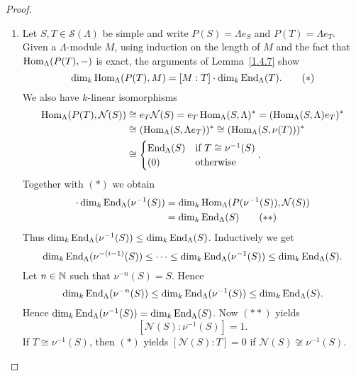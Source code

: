 \begin{proof}
\begin{enumerate}
\item Let $S,T\in\mathcal S(\Lambda)$ be simple and write $P(S)=\Lambda e_S$ and $P(T)=\Lambda e_T$. Given a $\Lambda$-module $M$, using induction on the length of $M$ and the fact that $\operatorname{Hom}_\Lambda(P(T),-)$ is exact, the arguments of Lemma~\ref{1.4.7} show
\[
\dim_k \operatorname{Hom}_\Lambda(P(T),M) = [M:T] \cdot \dim_k\operatorname{End}_\Lambda(T).\tag{$*$}
\]
We also have $k$-linear isomorphisms
\begin{align*}
\operatorname{Hom}_\Lambda(P(T),\mathcal N(S))
& \cong e_T \mathcal N(S)
  = e_T \operatorname{Hom}_\Lambda(S,\Lambda)^*
  = (\operatorname{Hom}_\Lambda(S,\Lambda)e_T)^* \\
& \cong (\operatorname{Hom}_\Lambda(S,\Lambda e_T))^*
  \cong (\operatorname{Hom}_\Lambda(S,\nu(T)))^* \\
& \cong
\begin{cases}
\operatorname{End}_\Lambda(S) & \text{if } T\cong \nu^{-1}(S)\\
(0) & \text{otherwise}
\end{cases}.
\end{align*}
Together with $(*)$ we obtain
\begin{align*}
[\mathcal N(S) : \nu^{-1}(S)] \cdot \dim_k\End_\Lambda(\nu^{-1}(S))
& = \dim_k \Hom_\Lambda(P(\nu^{-1}(S)),\mathcal N(S)) \\
& = \dim_k\End_\Lambda(S) \tag{$**$}
\end{align*}
%
Thus $\dim_k\operatorname{End}_\Lambda(\nu^{-1}(S)) \le \dim_k\operatorname{End}_\Lambda(S)$. Inductively we get
\[
\dim_k\operatorname{End}_\Lambda(\nu^{-(i-1)}(S)) \le \dots \le\dim_k\operatorname{End}_\Lambda(\nu^{-1}(S)) \le \dim_k\operatorname{End}_\Lambda(S).
\]
Let $n\in\mathbb{N}$ such that $\nu^{-n}(S)=S$. Hence
\[
\dim_k\operatorname{End}_\Lambda(\nu^{-n}(S)) \le\dim_k\operatorname{End}_\Lambda(\nu^{-1}(S)) \le \dim_k\operatorname{End}_\Lambda(S).
\]
Hence $\dim_k\operatorname{End}_\Lambda(\nu^{-1}(S)) = \dim_k\operatorname{End}_\Lambda(S)$. Now $(**)$ yields
\[
[\mathcal N(S) : \nu^{-1}(S)] = 1.
\]
If $T\cong\nu^{-1}(S)$, then $(*)$ yields $[\mathcal N(S) : T]=0$ if $\mathcal N(S)\not\cong\nu^{-1}(S)$.\qedhere
\end{enumerate}
\end{proof}


